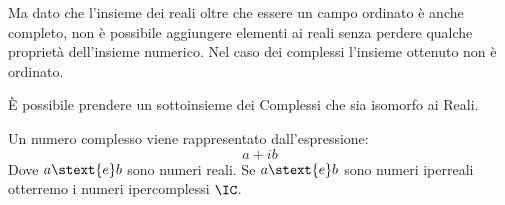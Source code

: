 Ma dato che l'insieme dei reali oltre che essere un campo ordinato è anche 
completo, non è possibile aggiungere elementi ai reali senza perdere 
qualche proprietà dell'insieme numerico. 
Nel caso dei complessi l'insieme ottenuto non è ordinato.

È possibile prendere un sottoinsieme dei Complessi che sia isomorfo ai Reali.

Un numero complesso viene rappresentato dall'espressione:
\[a +ib\]
Dove \(a \stext{e} b\) sono numeri reali.
Se \(a \stext{e} b\) sono numeri iperreali otterremo i numeri 
ipercomplessi \(\IC\).

% 


\newpage %



% 
